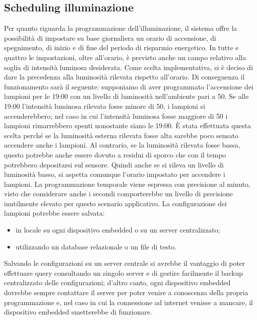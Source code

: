 \subsection{Scheduling illuminazione \label{si}}
Per quanto riguarda la programmazione dell'illuminazione, il sistema offre la possibilità di impostare su base giornaliera un orario di accensione, di spegnimento, di inizio e di fine del periodo di risparmio energetico.
In tutte e quattro le impostazioni, oltre all'orario, è previsto anche un campo relativo alla soglia di intensità luminosa desiderata.
Come scelta implementativa, si è deciso di dare la precedenza alla luminosità rilevata rispetto all'orario.
Di conseguenza il funzionamento sarà il seguente: supponiamo di aver programmato l'accensione dei lampioni per le 19:00 con un livello di luminosità nell'ambiente pari a 50.
Se alle 19:00 l'intensità luminosa rilevata fosse minore di 50, i lampioni si accenderebbero; nel caso in cui l'intensità luminosa fosse maggiore di 50 i lampioni rimarrebbero spenti nonostante siano le 19:00.
È stata effettuata questa scelta perché se la luminosità esterna rilevata fosse alta sarebbe poco sensato accendere anche i lampioni.
Al contrario, se la luminosità rilevata fosse bassa, questo potrebbe anche essere dovuto a residui di sporco che con il tempo potrebbero depositarsi sul sensore.
Quindi anche se si rileva un livello di luminosità basso, si aspetta comunque l'orario impostato per accendere i lampioni.
La programmazione temporale viene espressa con precisione al minuto, visto che considerare anche i secondi comporterebbe un livello di precisione inutilmente elevato per questo scenario applicativo.
La configurazione dei lampioni potrebbe essere salvata:
\begin{itemize}
 \item in locale su ogni dispositivo embedded o su un server centralizzato;
 \item utilizzando un database relazionale o un file di testo.
\end{itemize}
Salvando le configurazioni su un server centrale si avrebbe il vantaggio di poter effettuare query consultando un singolo server e di gestire facilmente il backup centralizzato delle configurazioni;
d'altro canto, ogni dispositivo embedded dovrebbe sempre contattare il server per poter venire a conoscenza della propria programmazione e, nel caso in cui la connessione ad internet venisse a mancare, il dispositivo embedded smetterebbe di funzionare.
